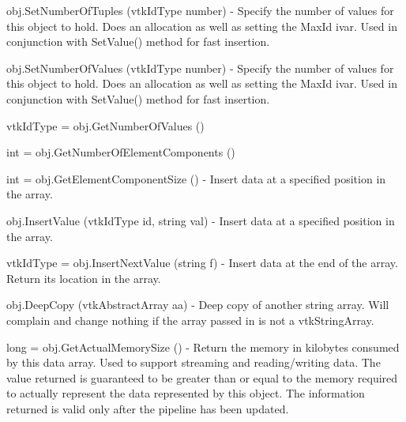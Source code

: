 \begin{DoxyItemize}
\item {\ttfamily obj.\-Set\-Number\-Of\-Tuples (vtk\-Id\-Type number)} -\/ Specify the number of values for this object to hold. Does an allocation as well as setting the Max\-Id ivar. Used in conjunction with Set\-Value() method for fast insertion.  
\item {\ttfamily obj.\-Set\-Number\-Of\-Values (vtk\-Id\-Type number)} -\/ Specify the number of values for this object to hold. Does an allocation as well as setting the Max\-Id ivar. Used in conjunction with Set\-Value() method for fast insertion.  
\item {\ttfamily vtk\-Id\-Type = obj.\-Get\-Number\-Of\-Values ()}  
\item {\ttfamily int = obj.\-Get\-Number\-Of\-Element\-Components ()}  
\item {\ttfamily int = obj.\-Get\-Element\-Component\-Size ()} -\/ Insert data at a specified position in the array.  
\item {\ttfamily obj.\-Insert\-Value (vtk\-Id\-Type id, string val)} -\/ Insert data at a specified position in the array.  
\item {\ttfamily vtk\-Id\-Type = obj.\-Insert\-Next\-Value (string f)} -\/ Insert data at the end of the array. Return its location in the array.  
\item {\ttfamily obj.\-Deep\-Copy (vtk\-Abstract\-Array aa)} -\/ Deep copy of another string array. Will complain and change nothing if the array passed in is not a vtk\-String\-Array.  
\item {\ttfamily long = obj.\-Get\-Actual\-Memory\-Size ()} -\/ Return the memory in kilobytes consumed by this data array. Used to support streaming and reading/writing data. The value returned is guaranteed to be greater than or equal to the memory required to actually represent the data represented by this object. The information returned is valid only after the pipeline has been updated.


\end{DoxyItemize}
